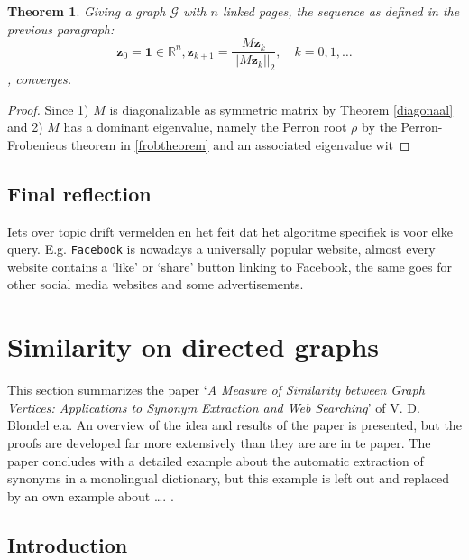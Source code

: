 \documentclass[a4paper,11pt]{report}
\newtheorem{theorem}{Theorem}[section]
\newcommand{\R}{{\mathbb R}}
\newcommand{\graf}{\mathscr{G}}
\begin{document}
 \begin{theorem}
   Giving a graph $\graf$ with $n$ linked pages, the sequence as defined in the previous paragraph: 
   $$\mathbf{z}_0 = \mathbf{1} \in \R^{n}, \mathbf{z}_{k+1} = \frac{M\mathbf{z}_k}{||M\mathbf{z}_k||_2}, \quad k = 
  0,1,\ldots$$,
  converges.
 \end{theorem}
\begin{proof}
  Since 1) $M$ is diagonalizable as symmetric matrix by Theorem \ref{diagonaal}  
  and 2) $M$ has a dominant eigenvalue, namely the Perron root $\rho$ by the 
  Perron-Frobenieus theorem in \ref{frobtheorem} and an associated eigenvalue 
  wit
\end{proof}
 
 
 
\subsection{Final reflection}
Iets over topic drift vermelden en het feit dat het algoritme specifiek is voor elke query. E.g. \texttt{Facebook} is nowadays a universally popular website, almost every website 
 contains a `like' or `share' button linking to Facebook, the same goes for 
 other social media websites and some advertisements.



\section{Similarity on directed graphs}
This section summarizes the paper `\emph{A Measure of Similarity between Graph Vertices: 
Applications to Synonym Extraction and Web Searching}'\cite{blondel} of V. D. Blondel e.a. 
An overview of the idea and results of the paper is presented, but the 
proofs are developed far more extensively than they are are in te paper. The 
paper concludes with a detailed example about the automatic extraction of 
synonyms in a monolingual dictionary, but this example is left out and replaced 
by an own example about \ldots. .

\subsection{Introduction}
\end{document}
